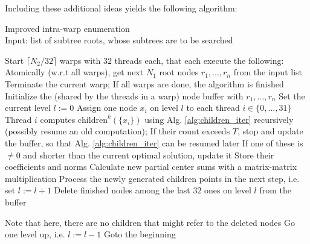 \documentclass{scrartcl}
\begin{document}
    Including these additional ideas yields the following algorithm:
    \begin{algorithm}[H]
        \caption{Improved intra-warp enumeration\label{alg:warp_enum_complex}\\Input: list of subtree roots, whose subtrees are to be searched}
        \begin{algorithmic}
            \STATE Start $\lceil N_2 / 32 \rceil$ warps with $32$ threads each, that each execute the following:
            \STATE Atomically (w.r.t all warps), get next $N_1$ root nodes $r_1, ..., r_n$ from the input list
                \STATE Terminate the current warp; If all warps are done, the algorithm is finished
            \ENDIF
            \STATE Initialize the (shared by the threads in a warp) node buffer with $r_1, ..., r_n$
            \STATE Set the current level $l := 0$
                    \STATE Assign one node $x_i$ on level $l$ to each thread $i \in \{0, ..., 31\}$
                    \STATE Thread $i$ computes $\mathrm{children}^k(\{x_i\})$ using Alg. \ref{alg:children_iter} recursively (possibly resume an old computation);
                    If their count exceeds $T$, stop and update the buffer, so that Alg. \ref{alg:children_iter} can be resumed later
                        \STATE If one of these is $\neq 0$ and shorter than the current optimal solution, update it
                    \ELSE
                        \STATE Store their coefficients and norms
                        \STATE Calculate new partial center sums with a matrix-matrix multiplication
                    \ENDIF
                \ENDWHILE
                    \STATE Process the newly generated children points in the next step, i.e. set $l := l + 1$
                \ELSE
                    \STATE Delete finished nodes among the last $32$ ones on level $l$ from the buffer

                    Note that here, there are no children that might refer to the deleted nodes
                        \STATE Go one level up, i.e. $l := l - 1$
                    \ENDIF
                \ENDIF
            \ENDWHILE
            \STATE Goto the beginning
        \end{algorithmic}
    \end{algorithm}
\end{document}
